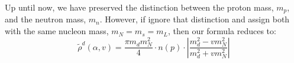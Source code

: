 \documentclass{article}
\begin{document}
  Up until now, we have preserved the distinction between the proton mass, $m_p$, and the neutron mass, $m_n$. However, if
  ignore that distinction and assign both with the same nucleon mass, $m_N = m_s = m_L$, then our formula reduces to:
  \begin{equation}
    \tilde{\rho}^d(\alpha,v) = \frac{\pi m_d m_N^2}{4} \cdot n(p) \cdot \left| \frac{m_d^2 - vm_N^2}{m_d^2 + vm_N^2} \right|   
  \end{equation}
\end{document}
